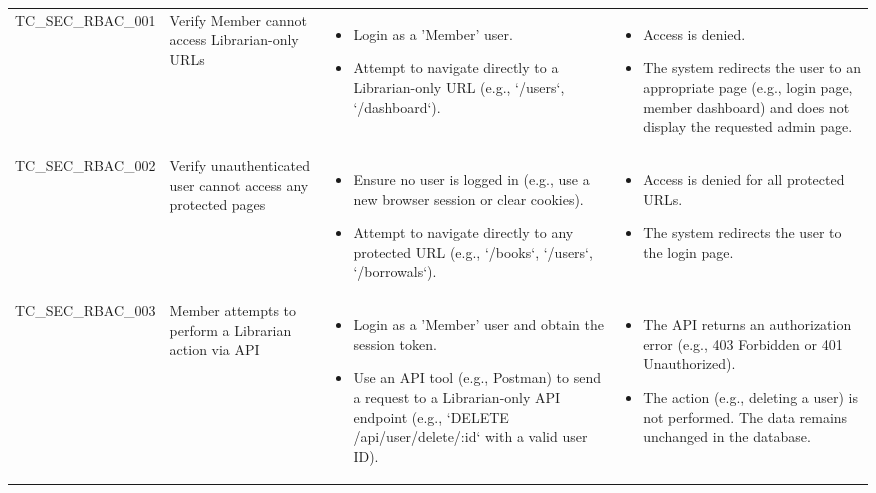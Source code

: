 \begin{longtable}{|>{\scriptsize\raggedright\arraybackslash}p{3cm}|>{\raggedright\arraybackslash}p{3cm}|>{\scriptsize\raggedright\arraybackslash}p{4cm}|>{\scriptsize\raggedright\arraybackslash}p{5cm}|}
\multicolumn{4}{|l|}{\textbf{Sub-Section: Access Control \& Authorization (RBAC)}} \\ \hline
TC\_SEC\_RBAC\_001 & Verify Member cannot access Librarian-only URLs  & 
    \begin{itemize}[leftmargin=*]
        \item Login as a 'Member' user.
        \item Attempt to navigate directly to a Librarian-only URL (e.g., `/users`, `/dashboard`).
    \end{itemize} & 
    \begin{itemize}[leftmargin=*]
        \item Access is denied.
        \item The system redirects the user to an appropriate page (e.g., login page, member dashboard) and does not display the requested admin page.
    \end{itemize} \\ \hline
TC\_SEC\_RBAC\_002 & Verify unauthenticated user cannot access any protected pages  & 
    \begin{itemize}[leftmargin=*]
        \item Ensure no user is logged in (e.g., use a new browser session or clear cookies).
        \item Attempt to navigate directly to any protected URL (e.g., `/books`, `/users`, `/borrowals`).
    \end{itemize} & 
    \begin{itemize}[leftmargin=*]
        \item Access is denied for all protected URLs.
        \item The system redirects the user to the login page.
    \end{itemize} \\ \hline
TC\_SEC\_RBAC\_003 & Member attempts to perform a Librarian action via API  & 
    \begin{itemize}[leftmargin=*]
        \item Login as a 'Member' user and obtain the session token.
        \item Use an API tool (e.g., Postman) to send a request to a Librarian-only API endpoint (e.g., `DELETE /api/user/delete/:id` with a valid user ID).
    \end{itemize} & 
    \begin{itemize}[leftmargin=*]
        \item The API returns an authorization error (e.g., 403 Forbidden or 401 Unauthorized).
        \item The action (e.g., deleting a user) is not performed. The data remains unchanged in the database.
    \end{itemize} \\ \hline


\end{longtable}
